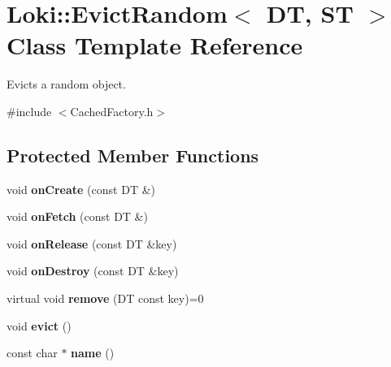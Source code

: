 \hypertarget{classLoki_1_1EvictRandom}{}\section{Loki\+:\+:Evict\+Random$<$ D\+T, S\+T $>$ Class Template Reference}
\label{classLoki_1_1EvictRandom}


Evicts a random object.  




{\ttfamily \#include $<$Cached\+Factory.\+h$>$}

\subsection*{Protected Member Functions}
\begin{DoxyCompactItemize}
\item 
\hypertarget{classLoki_1_1EvictRandom_ac0fb50f3b85ba583fa568eb9e3514c1c}{}void {\bfseries on\+Create} (const D\+T \&)\label{classLoki_1_1EvictRandom_ac0fb50f3b85ba583fa568eb9e3514c1c}

\item 
\hypertarget{classLoki_1_1EvictRandom_a6941d04a9d28ca0853794144fa368ac7}{}void {\bfseries on\+Fetch} (const D\+T \&)\label{classLoki_1_1EvictRandom_a6941d04a9d28ca0853794144fa368ac7}

\item 
\hypertarget{classLoki_1_1EvictRandom_a847733034188570ddbc85bb9ef569a92}{}void {\bfseries on\+Release} (const D\+T \&key)\label{classLoki_1_1EvictRandom_a847733034188570ddbc85bb9ef569a92}

\item 
\hypertarget{classLoki_1_1EvictRandom_afbb21cd053c738d5fb9de7ae585c36db}{}void {\bfseries on\+Destroy} (const D\+T \&key)\label{classLoki_1_1EvictRandom_afbb21cd053c738d5fb9de7ae585c36db}

\item 
\hypertarget{classLoki_1_1EvictRandom_a3fce9f22600584a3bdca8868e15ce5b7}{}virtual void {\bfseries remove} (D\+T const key)=0\label{classLoki_1_1EvictRandom_a3fce9f22600584a3bdca8868e15ce5b7}

\item 
\hypertarget{classLoki_1_1EvictRandom_a50482188122aaa94bcf0a75635354821}{}void {\bfseries evict} ()\label{classLoki_1_1EvictRandom_a50482188122aaa94bcf0a75635354821}

\item 
\hypertarget{classLoki_1_1EvictRandom_a6f2bcfe45c79e23b529ec6c7c3b0802b}{}const char $\ast$ {\bfseries name} ()\label{classLoki_1_1EvictRandom_a6f2bcfe45c79e23b529ec6c7c3b0802b}

\end{DoxyCompactItemize}


